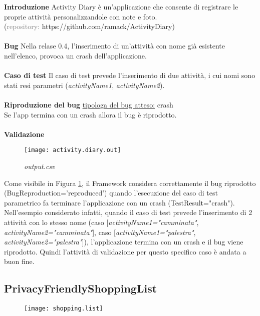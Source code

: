 \noindent\textbf{Introduzione}\newline
Activity Diary è un’applicazione che consente di registrare le proprie attività personalizzandole con note e foto.\\ (\textcolor{gray}{repository: }https://github.com/ramack/ActivityDiary)
\\\\
\noindent\textbf{Bug}\newline
Nella relase 0.4, l’inserimento di un’attività con nome già esistente nell’elenco, provoca un crash dell’applicazione.
\\\\
\noindent\textbf{Caso di test}\newline
Il caso di test prevede l'inserimento di due attività, i cui nomi sono stati resi parametri (\emph{activityName1}, \emph{activityName2}). 
\\\\
\noindent\textbf{Riproduzione del bug}\newline
\noindent\ul{tipologa del bug atteso:} crash\\
Se l’app termina con un crash allora il bug è riprodotto.
\\\\
\noindent\textbf{Validazione}
 \begin{figure}[H]
	\texttt{[image: activity.diary.out]}
	\centering
				\caption{\emph{output.csv}}
    \label{fig:activity.diary}
\end{figure}
\noindent Come visibile in Figura \ref{fig:activity.diary}, il Framework considera correttamente il bug riprodotto (BugReproduction='reproduced') quando l'esecuzione del caso di test parametrico fa terminare l'applicazione con un crash (TestResult="crash"). Nell'esempio considerato infatti,  quando il caso di test prevede l'inserimento di 2 attività con lo stesso nome (caso [\emph{activityName1="camminata"}, \emph{activityName2="camminata"}], caso [\emph{activityName1="palestra"}, \emph{activityName2="palestra"}]), l'applicazione termina con un crash e il bug viene riprodotto. Quindi l'attività di validazione per questo specifico caso è andata a buon fine.

\subsection{PrivacyFriendlyShoppingList}
 \begin{figure}[H]
	\texttt{[image: shopping.list]}
	\centering
\end{figure}

